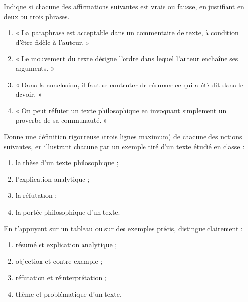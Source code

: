 \documentclass[11pt]{article}
\newcommand{\cle}[1]{{\popxbold\color{popdark}#1}}
\newcounter{popsec}
\newcounter{popsub}
\newcommand{\courssub}[1]{%
  \stepcounter{popsub}%
  \par\vspace{9pt}\noindent{\popxbold\fontsize{11.5}{13}\selectfont\color{popink}{\color{poporange}\thepopsec.\thepopsub}\hspace{6pt}#1}\par\nopagebreak\vspace{4pt}
}
\begin{document}
\begin{exercice}
Indique si chacune des affirmations suivantes est vraie ou fausse, en justifiant en deux ou trois phrases.
\begin{enumerate}
\item « La paraphrase est acceptable dans un commentaire de texte, à condition d'être fidèle à l'auteur. »
\item « Le mouvement du texte désigne l'ordre dans lequel l'auteur enchaîne ses arguments. »
\item « Dans la conclusion, il faut se contenter de résumer ce qui a été dit dans le devoir. »
\item « On peut réfuter un texte philosophique en invoquant simplement un proverbe de sa communauté. »
\end{enumerate}
\end{exercice}

\begin{exercice}
Donne une définition rigoureuse (trois lignes maximum) de chacune des notions suivantes, en illustrant chacune par un exemple tiré d'un texte étudié en classe :
\begin{enumerate}
\item la \cle{thèse} d'un texte philosophique ;
\item l'\cle{explication analytique} ;
\item la \cle{réfutation} ;
\item la \cle{portée philosophique} d'un texte.
\end{enumerate}
\end{exercice}

\begin{exercice}
En t'appuyant sur un tableau ou sur des exemples précis, distingue clairement :
\begin{enumerate}
\item \cle{résumé} et \cle{explication analytique} ;
\item \cle{objection} et \cle{contre-exemple} ;
\item \cle{réfutation} et \cle{réinterprétation} ;
\item \cle{thème} et \cle{problématique} d'un texte.
\end{enumerate}
\end{exercice}

\courssub{Je m'entraîne}
\end{document}

